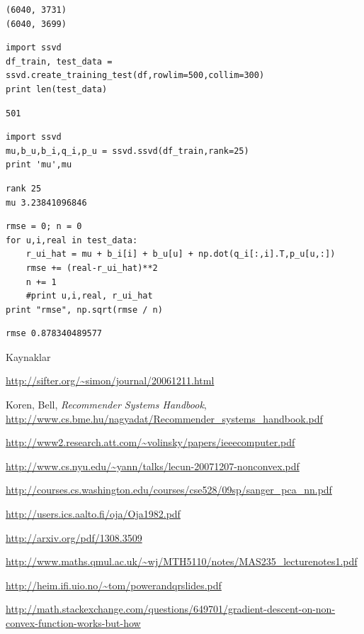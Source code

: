 \documentclass[12pt,fleqn]{article}\usepackage{../common}
\begin{document}
\begin{verbatim}
(6040, 3731)
(6040, 3699)
\end{verbatim}

\begin{verbatim}
import ssvd
df_train, test_data = ssvd.create_training_test(df,rowlim=500,collim=300)
print len(test_data)
\end{verbatim}

\begin{verbatim}
501
\end{verbatim}


\begin{verbatim}
import ssvd
mu,b_u,b_i,q_i,p_u = ssvd.ssvd(df_train,rank=25)
print 'mu',mu
\end{verbatim}

\begin{verbatim}
rank 25
mu 3.23841096846
\end{verbatim}


\begin{verbatim}
rmse = 0; n = 0
for u,i,real in test_data:
    r_ui_hat = mu + b_i[i] + b_u[u] + np.dot(q_i[:,i].T,p_u[u,:])
    rmse += (real-r_ui_hat)**2
    n += 1
    #print u,i,real, r_ui_hat
print "rmse", np.sqrt(rmse / n)
\end{verbatim}

\begin{verbatim}
rmse 0.878340489577
\end{verbatim}










Kaynaklar

\url{http://sifter.org/~simon/journal/20061211.html}

Koren, Bell, {\em Recommender Systems Handbook},
\url{http://www.cs.bme.hu/nagyadat/Recommender_systems_handbook.pdf}

\url{http://www2.research.att.com/~volinsky/papers/ieeecomputer.pdf}

\url{http://www.cs.nyu.edu/~yann/talks/lecun-20071207-nonconvex.pdf}

\url{http://courses.cs.washington.edu/courses/cse528/09sp/sanger_pca_nn.pdf}

\url{http://users.ics.aalto.fi/oja/Oja1982.pdf}

\url{http://arxiv.org/pdf/1308.3509}

\url{http://www.maths.qmul.ac.uk/~wj/MTH5110/notes/MAS235_lecturenotes1.pdf}

\url{http://heim.ifi.uio.no/~tom/powerandqrslides.pdf}

\url{http://math.stackexchange.com/questions/649701/gradient-descent-on-non-convex-function-works-but-how}
\end{document}
